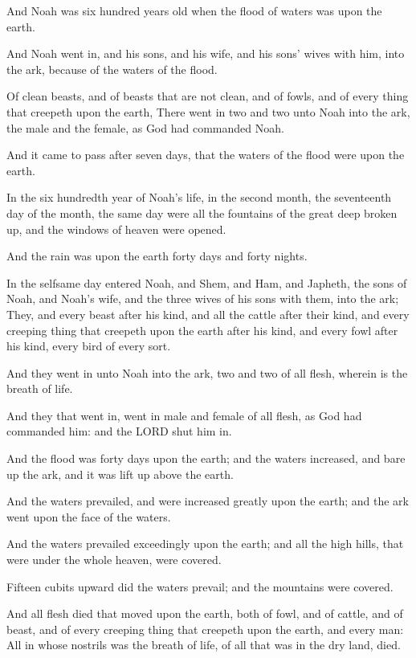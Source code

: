 \verse And Noah was six hundred years old when the flood of waters was upon the earth.

\verse And Noah went in, and his sons, and his wife, and his sons' wives with him, into the ark, because of the waters of the flood.

\verse Of clean beasts, and of beasts that are not clean, and of fowls, and of every thing that creepeth upon the earth, \verse There went in two and two unto Noah into the ark, the male and the female, as God had commanded Noah.

\verse And it came to pass after seven days, that the waters of the flood were upon the earth.

\verse In the six hundredth year of Noah's life, in the second month, the seventeenth day of the month, the same day were all the fountains of the great deep broken up, and the windows of heaven were opened.

\verse And the rain was upon the earth forty days and forty nights.

\verse In the selfsame day entered Noah, and Shem, and Ham, and Japheth, the sons of Noah, and Noah's wife, and the three wives of his sons with them, into the ark; \verse They, and every beast after his kind, and all the cattle after their kind, and every creeping thing that creepeth upon the earth after his kind, and every fowl after his kind, every bird of every sort.

\verse And they went in unto Noah into the ark, two and two of all flesh, wherein is the breath of life.

\verse And they that went in, went in male and female of all flesh, as God had commanded him: and the LORD shut him in.

\verse And the flood was forty days upon the earth; and the waters increased, and bare up the ark, and it was lift up above the earth.

\verse And the waters prevailed, and were increased greatly upon the earth; and the ark went upon the face of the waters.

\verse And the waters prevailed exceedingly upon the earth; and all the high hills, that were under the whole heaven, were covered.

\verse Fifteen cubits upward did the waters prevail; and the mountains were covered.

\verse And all flesh died that moved upon the earth, both of fowl, and of cattle, and of beast, and of every creeping thing that creepeth upon the earth, and every man: \verse All in whose nostrils was the breath of life, of all that was in the dry land, died.

